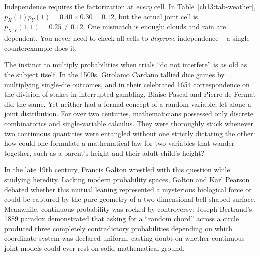 \begin{trapbox}
Independence requires the factorization at \emph{every} cell. In
Table~\ref{ch13:tab-weather}, $p_X(1)p_Y(1)=0.40\times0.30=0.12$, but the actual
joint cell is $p_{X,Y}(1,1)=0.25\ne 0.12$. One mismatch is enough: clouds and
rain are dependent. You never need to check all cells to \emph{disprove}
independence -- a single counterexample does it.
\end{trapbox}

\begin{historybox}
The instinct to multiply probabilities when trials ``do not interfere'' is as
old as the subject itself. In the 1500s, Girolamo Cardano tallied dice games by
multiplying single-die outcomes, and in their celebrated 1654 correspondence on
the division of stakes in interrupted gambling, Blaise Pascal and Pierre de
Fermat did the same. Yet neither had a formal concept of a random variable, let
alone a joint distribution. For over two centuries, mathematicians possessed only
discrete combinatorics and single-variable calculus. They were thoroughly stuck
whenever two continuous quantities were entangled without one strictly dictating
the other: how could one formulate a mathematical law for two variables that
wander together, such as a parent's height and their adult child's height?

In the late 19th century, Francis Galton wrestled with this question while
studying heredity. Lacking modern probability spaces, Galton and Karl Pearson
debated whether this mutual leaning represented a mysterious biological force or
could be captured by the pure geometry of a two-dimensional bell-shaped surface.
Meanwhile, continuous probability was rocked by controversy: Joseph Bertrand's
1889 paradox demonstrated that asking for a ``random chord'' across a circle
produced three completely contradictory probabilities depending on which coordinate
system was declared uniform, casting doubt on whether continuous joint models
could ever rest on solid mathematical ground.


\end{historybox}

